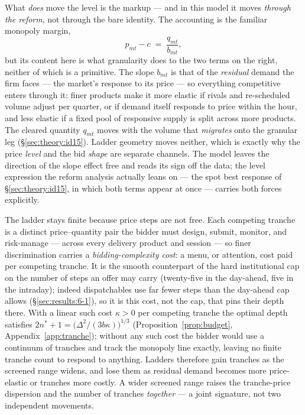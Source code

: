 \documentclass[11pt,a4paper]{article}
\theoremstyle{definition}
\theoremstyle{remark}
\theoremstyle{plain}
\begin{document}
What \emph{does} move the level is the markup --- and in this model it moves \emph{through the reform}, not through the bare identity. The accounting is the familiar monopoly margin,
\begin{equation}
p_{mt} - c \;=\; \frac{q_{mt}}{b_{mt}},
\label{eq:cournot-markup}
\end{equation}
but its content here is what granularity does to the two terms on the right, neither of which is a primitive. The slope $b_{mt}$ is that of the \emph{residual} demand the firm faces --- the market's response to its price --- so everything competitive enters through it: finer products make it more elastic if rivals and re-scheduled volume adjust per quarter, or if demand itself responds to price within the hour, and less elastic if a fixed pool of responsive supply is split across more products. The cleared quantity $q_{mt}$ moves with the volume that \emph{migrates} onto the granular leg (\S\ref{sec:theory:id15}). Ladder geometry moves neither, which is exactly why the price \emph{level} and the bid \emph{shape} are separate channels. The model leaves the direction of the slope effect free and reads its sign off the data; the level expression the reform analysis actually leans on --- the spot best response of \S\ref{sec:theory:id15}, in which both terms appear at once --- carries both forces explicitly.

The ladder stays finite because price steps are not free. Each competing tranche is a distinct price--quantity pair the bidder must design, submit, monitor, and risk-manage --- across every delivery product and session --- so finer discrimination carries a \emph{bidding-complexity cost}: a menu, or attention, cost paid per competing tranche. It is the smooth counterpart of the hard institutional cap on the number of steps an offer may carry (twenty-five in the day-ahead, five in the intraday); indeed dispatchables use far fewer steps than the day-ahead cap allows (\S\ref{sec:results:6-1}), so it is this cost, not the cap, that pins their depth there. With a linear such cost $\kappa > 0$ per competing tranche the optimal depth satisfies $2 n^* + 1 = \bigl(\Delta^2/(3 b \kappa)\bigr)^{1/3}$ (Proposition~\ref{prop:budget}, Appendix~\ref{app:tranche}); without any such cost the bidder would use a continuum of tranches and track the monopoly line exactly, leaving no finite tranche count to respond to anything. Ladders therefore gain tranches as the screened range widens, and lose them as residual demand becomes more price-elastic or tranches more costly. A wider screened range raises the tranche-price dispersion and the number of tranches \emph{together} --- a joint signature, not two independent movements.
\end{document}
